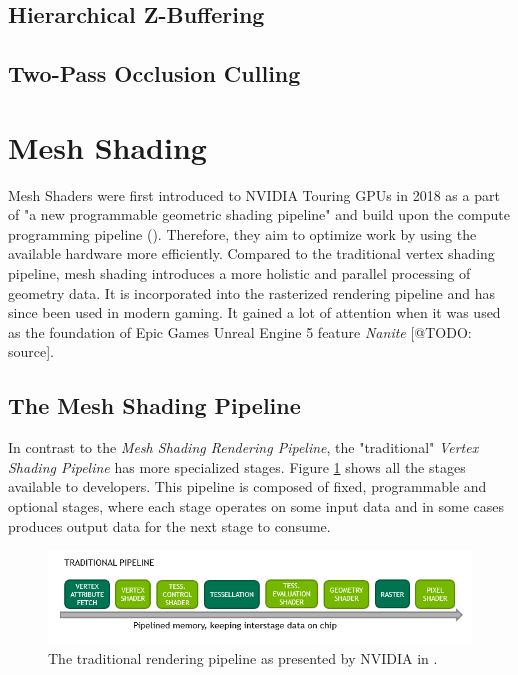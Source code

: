 \subsection{Hierarchical Z-Buffering} \label{subsec-hierarchical-z-buffering}


\subsection{Two-Pass Occlusion Culling} \label{subsec-two-pass-occlusion-culling}


\section{Mesh Shading}  \label{sec-mesh-shading}

Mesh Shaders were first introduced to NVIDIA Touring \ac{GPU}s in 2018 as a part of
"a new programmable geometric shading pipeline" and build upon the compute programming 
pipeline (\cite{Kubisch2018}). Therefore, they aim to optimize work by 
using the available hardware more efficiently. Compared to the traditional vertex shading 
pipeline, mesh shading introduces a more holistic and parallel processing of geometry data.
It is incorporated into the rasterized rendering pipeline and has since been used in modern 
gaming. It gained a lot of attention when it was used as the foundation of Epic Games 
Unreal Engine 5 feature \emph{Nanite} [@TODO: source].\\

\subsection{The Mesh Shading Pipeline} \label{subsec-the-mesh-shading-pipeline}

In contrast to the \emph{Mesh Shading Rendering Pipeline}, the "traditional" \emph{Vertex Shading Pipeline} 
has more specialized stages. Figure \ref{fig:traditional-rendering-pipeline} shows all the stages available 
to developers. This pipeline is composed of fixed, programmable and optional stages, where each 
stage operates on some input data and in some cases produces output data for the next stage to consume.\\

\begin{figure}[h]
    \centering
    \includegraphics[width=\linewidth]{images/graphics/traditional-rendering-pipeline.png}
    \caption{The traditional rendering pipeline as presented by NVIDIA in \cite{Kubisch2018}.}
    \label{fig:traditional-rendering-pipeline}
\end{figure}

